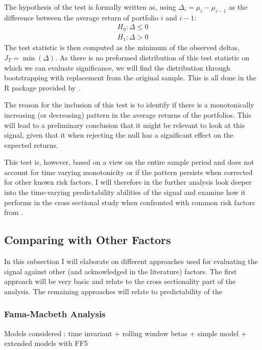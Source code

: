 The hypothesis of the \cite{patton2010monotonicity} test is formally written as, using $\Delta_{i} = \mu _{i} - \mu_{i-1}$ as the difference between the average return of portfolio $i$ and $i-1$:
\begin{equation}
	\begin{array}{c}
		H_{0}:\Delta\leq0\\
		H_{1}:\Delta>0
	\end{array}
\end{equation}
The test statistic is then computed as the minimum of the observed deltas, $J_{T} = \min \left( \Delta \right)$. As there is no preformed distribution of this test statistic on which we can evaluate significance, we will find the distribution through bootstrapping with replacement from the original sample. This is all done in the R package provided by \cite{rpackagemonotonicity}. 

The reason for the inclusion of this test is to identify if there is a monotonically increasing (or decreasing) pattern in the average returns of the portfolios. This will lead to a preliminary conclusion that it might be relevant to look at this signal, given that it when rejecting the null has a significant effect on the expected returns. 

This test is, however, based on a view on the entire sample period and does not account for time varying monotonicity or if the pattern persists when corrected for other known risk factors. I will therefore in the further analysis look deeper into the time-varying predictability abilities of the signal and examine how it performs in the cross sectional study when confronted with common risk factors from \cite{fama1984term}.

\subsection{Comparing with Other Factors}

In this subsection I will elaborate on different approaches used for evaluating the signal against other (and acknowledged in the literature) factors. The first approach will be very basic and relate to the cross sectionality part of the analysis. The remaining approaches will relate to predictability of the 

\subsubsection{Fama-Macbeth Analysis}
Models considered : time invariant + rolling window betas + simple model + extended models with FF5

